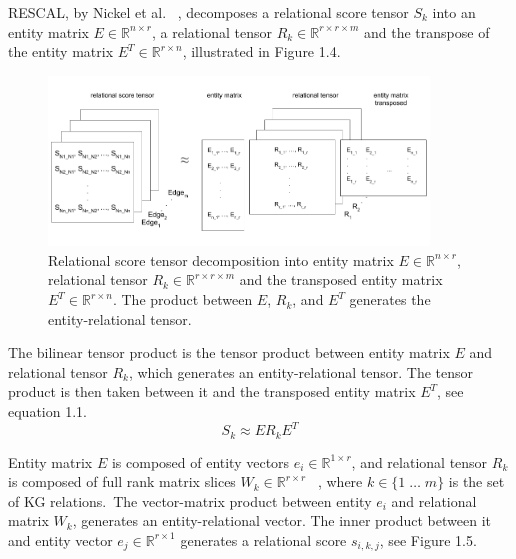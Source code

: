 \noindent RESCAL, by Nickel et al. \unskip~\citep{nickel2011three}, decomposes a relational score tensor $ S_k $ into an entity matrix $ E  \in \mathbb{R}^{n \times r} $, a relational tensor $ R_k \in \mathbb{R}^{r \times r \times m}$ and the transpose of the entity matrix $ E^T \in \mathbb{R}^{r \times n} $, illustrated in Figure 1.4. \par

\begin{figure}[H]
   	\centering
    	\includegraphics[width=0.9\textwidth, height=0.4\textwidth]{relational_tensor_entity_relational_factorisation}
	\captionsetup{justification=centering}
	\caption{Relational score tensor decomposition into entity matrix $ E  \in \mathbb{R}^{n \times r} $, relational tensor $ R_k \in \mathbb{R}^{r \times r \times m} $ and the transposed entity matrix $ E^T \in \mathbb{R}^{r \times n} $. The product between $ E $, $ R_k $, and $ E^T $ generates the entity-relational tensor.}
\end{figure}

\noindent The bilinear tensor product is the tensor product between entity matrix $ E $ and relational tensor $ R_k $, which generates an entity-relational tensor. The tensor product is then taken between it and the transposed entity matrix $ E^T $, see equation 1.1.
\begin{equation}
	S_k \approx ER_kE^T
\end{equation}

\noindent Entity matrix $ E $ is composed of entity vectors $ e_i \in \mathbb{R}^{1 \times r} $, and relational tensor $ R_k $ is composed of full rank matrix slices $ W_k \in \mathbb{R}^{r \times r} $ \unskip~\citep{nickel2012factorizing}, where $ k \in \{1 \; \dots \; m \} $ is the set of KG relations.\ The vector-matrix product between entity $ e_i $ and relational matrix $ W_k $, generates an entity-relational vector. The inner product between it and entity vector $ e_j \in \mathbb{R}^{r \times 1} $ generates a relational score $ s_{i,k,j} $, see Figure 1.5. 

